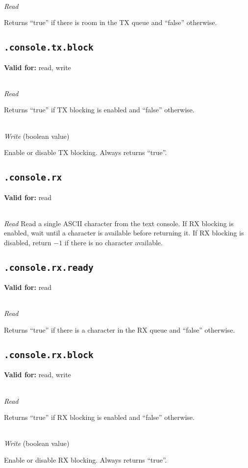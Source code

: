 \documentclass{article}
\begin{document}
~\\
\textit{Read}

Returns ``true'' if there is room in the TX queue and ``false'' otherwise.

\subsection{\texttt{.console.tx.block}}
\textbf{Valid for:} read, write

~\\
\textit{Read}

Returns ``true'' if TX blocking is enabled and ``false'' otherwise.

~\\
\textit{Write} (boolean value)

Enable or disable TX blocking. Always returns ``true''.

\subsection{\texttt{.console.rx}}
\textbf{Valid for:} read

~\\
\textit{Read}
Read a single ASCII character from the text console. If RX blocking is enabled, wait until a character is available before returning it.
If RX blocking is disabled, return $-1$ if there is no character available.

\subsection{\texttt{.console.rx.ready}}
\textbf{Valid for:} read

~\\
\textit{Read}

Returns ``true'' if there is a character in the RX queue and ``false'' otherwise.

\subsection{\texttt{.console.rx.block}}
\textbf{Valid for:} read, write

~\\
\textit{Read}

Returns ``true'' if RX blocking is enabled and ``false'' otherwise.

~\\
\textit{Write} (boolean value)

Enable or disable RX blocking. Always returns ``true''.
\end{document}
